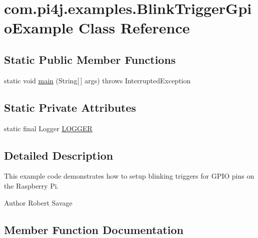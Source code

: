 \hypertarget{classcom_1_1pi4j_1_1examples_1_1BlinkTriggerGpioExample}{}\section{com.\+pi4j.\+examples.\+Blink\+Trigger\+Gpio\+Example Class Reference}
\label{classcom_1_1pi4j_1_1examples_1_1BlinkTriggerGpioExample}
\subsection*{Static Public Member Functions}
\begin{DoxyCompactItemize}
\item 
static void \hyperlink{classcom_1_1pi4j_1_1examples_1_1BlinkTriggerGpioExample_a005727d9915c31b30913e834d11c56ba}{main} (String\mbox{[}$\,$\mbox{]} args)  throws Interrupted\+Exception 
\end{DoxyCompactItemize}
\subsection*{Static Private Attributes}
\begin{DoxyCompactItemize}
\item 
static final Logger \hyperlink{classcom_1_1pi4j_1_1examples_1_1BlinkTriggerGpioExample_add8c26155d1378c3b0e47c1631b56286}{L\+O\+G\+G\+E\+R}
\end{DoxyCompactItemize}


\subsection{Detailed Description}
This example code demonstrates how to setup blinking triggers for G\+P\+I\+O pins on the Raspberry Pi.

\begin{DoxyAuthor}{Author}
Robert Savage 
\end{DoxyAuthor}


\subsection{Member Function Documentation}
\hypertarget{classcom_1_1pi4j_1_1examples_1_1BlinkTriggerGpioExample_a005727d9915c31b30913e834d11c56ba}{}
